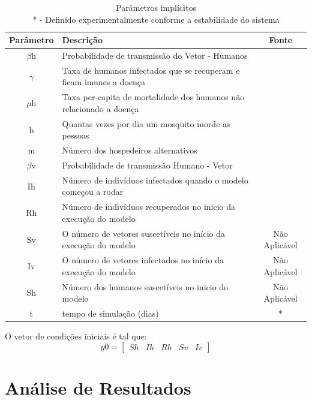 \documentclass[conference]{IEEEtran}
\begin{document}
\begin{table}[!ht]
\begin{tabular}{| c | L{5cm} | c |}
Parâmetro & Descrição & Fonte\\
 \hline\hline
 $ \beta $h & Probabilidade de transmissão do Vetor - Humanos & \cite{nishiura2006mathematical,10.1371/journal.pone.0049085} \\ \hline
 $ \gamma $ & Taxa de humanos infectados que se recuperam e ficam imunes a doença & \cite{espiritosanto} \\ \hline
 $\mu $h & Taxa per-capita de mortalidade dos humanos não relacionado a doença & \cite{ibge-mortalidade} \\ \hline
 b & Quantas vezes por dia um mosquito morde as pessoas & \cite{10.1371/journal.pone.0049085} \\ \hline
 m & Número dos hospedeiros alternativos & \cite{nishiura2006mathematical} \\ \hline
 $ \beta $v & Probabilidade de transmissão Humano - Vetor & \cite{10.1371/journal.pone.0049085} \\ \hline
 Ih & Número de indivíduos infectados quando o modelo começou a rodar & \cite{svs} \\ \hline
 Rh & Número de indivíduos recuperados no inicio da execução do modelo & \cite{svs} \\ \hline
 Sv & O número de vetores suscetíveis no início da execução do modelo & Não Aplicável \\ \hline
 Iv & O número de vetores infectados no início da execução do modelo & Não Aplicável \\ \hline
 Sh &  Número dos humanos suscetíveis no inicio do modelo & Não Aplicável \\ \hline
 t & tempo de simulação (dias)  & * \\ \hline
\end{tabular}

\caption{Parâmetros implícitos \protect\\ * - Definido experimentalmente conforme a estabilidade do sistema}
\label{table:2}
\end{table}

O vetor de condições iniciais é tal que: 
  $$
  y0 = \left[
\begin{array}{rrrrr}
 Sh & Ih & Rh & Sv & Iv
\end{array}\right]
$$

\section{Análise de Resultados}
\end{document}
